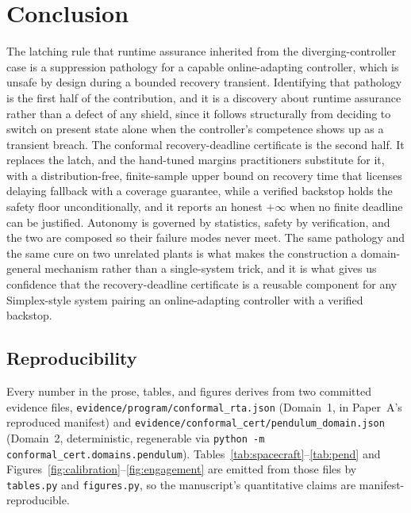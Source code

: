 \documentclass[11pt]{article}
\theoremstyle{plain}
\theoremstyle{definition}
\begin{document}
\section{Conclusion}
\label{sec:conclusion}
The latching rule that runtime assurance inherited from the diverging-controller case is a
suppression pathology for a capable online-adapting controller, which is unsafe by design
during a bounded recovery transient. Identifying that pathology is the first half of the
contribution, and it is a discovery about runtime assurance rather than a defect of any
shield, since it follows structurally from deciding to switch on present state alone when the
controller's competence shows up as a transient breach. The conformal recovery-deadline
certificate is the second half. It replaces
the latch, and the hand-tuned margins practitioners substitute for it, with a
distribution-free, finite-sample upper bound on recovery time that licenses
delaying fallback with a coverage guarantee, while a verified backstop holds the safety floor
unconditionally, and it reports an honest $+\infty$ when no finite deadline can be justified.
Autonomy is governed by statistics, safety by verification, and the two are composed so their
failure modes never meet. The same
pathology and the same cure on two unrelated plants is what makes the construction a
domain-general mechanism rather than a single-system trick, and it is what gives us
confidence that the recovery-deadline certificate is a reusable component for any
Simplex-style system pairing an online-adapting controller with a verified backstop.

\subsection{Reproducibility} Every number in the prose, tables, and figures derives from two
committed evidence files, \texttt{evidence/program/conformal\_rta.json} (Domain~1, in
Paper~A's reproduced manifest) and \texttt{evidence/conformal\_cert/pendulum\_domain.json}
(Domain~2, deterministic, regenerable via \texttt{python -m conformal\_cert.domains.pendulum}).
Tables~\ref{tab:spacecraft}--\ref{tab:pend} and
Figures~\ref{fig:calibration}--\ref{fig:engagement} are emitted from those files by
\texttt{tables.py} and \texttt{figures.py}, so the manuscript's quantitative claims are
manifest-reproducible.
\end{document}
